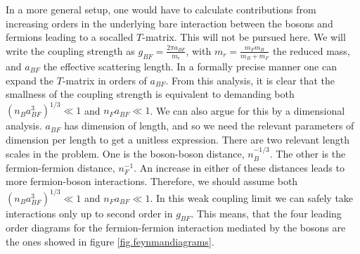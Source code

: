 In a more general setup, one would have to calculate contributions from increasing orders in the underlying bare interaction between the bosons and fermions leading to a socalled $T$-matrix. This will not be pursued here. We will write the coupling strength as $g_{BF} = \frac{2\pi a_{BF}}{m_r}$, with $m_r = \frac{m_Fm_B}{m_B + m_F}$ the reduced mass, and $a_{BF}$ the effective scattering length. In a formally precise manner one can expand the $T$-matrix in orders of $a_{BF}$. From this analysis, it is clear that the smallness of the coupling strength is equivalent to demanding both $(n_Ba_{BF}^3)^{1/3}\ll 1$ and $n_Fa_{BF} \ll 1$. We can also argue for this by a dimensional analysis. $a_{BF}$ has dimension of length, and so we need the relevant parameters of dimension per length to get a unitless expression. There are two relevant length scales in the problem. One is the boson-boson distance, $n_B^{-1/3}$. The other is the fermion-fermion distance, $n_F^{-1}$. An increase in either of these distances leads to more fermion-boson interactions. Therefore, we should assume both $(n_Ba_{BF}^3)^{1/3} \ll 1$ and $n_Fa_{BF}\ll 1$. In this weak coupling limit we can safely take interactions only up to second order in $g_{BF}$. This means, that the four leading order diagrams for the fermion-fermion interaction mediated by the bosons are the ones showed in figure \ref{fig.feynmandiagrams}. 

